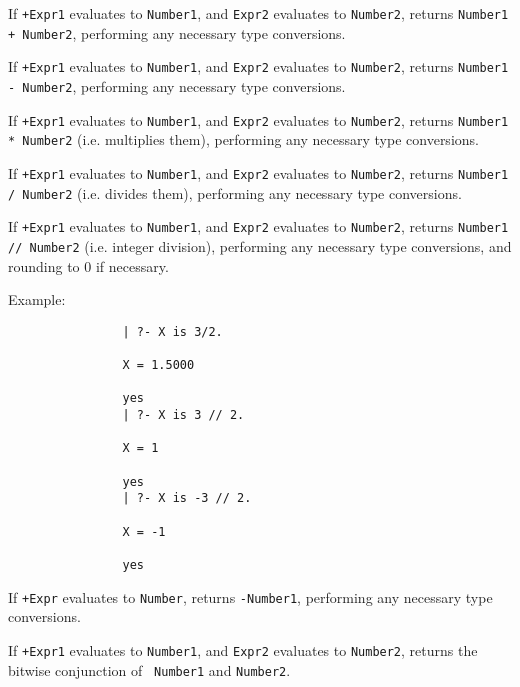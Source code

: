 \begin{description}
If {\tt +Expr1} evaluates to {\tt Number1}, and {\tt Expr2} evaluates
to {\tt Number2}, returns {\tt Number1 + Number2}, performing any
necessary type conversions.

If {\tt +Expr1} evaluates to {\tt Number1}, and {\tt Expr2} evaluates
to {\tt Number2}, returns {\tt Number1 - Number2}, performing any
necessary type conversions.

If {\tt +Expr1} evaluates to {\tt Number1}, and {\tt Expr2} evaluates
to {\tt Number2}, returns {\tt Number1 * Number2} (i.e. multiplies
them), performing any necessary type conversions.

If {\tt +Expr1} evaluates to {\tt Number1}, and {\tt Expr2} evaluates
to {\tt Number2}, returns {\tt Number1 / Number2} (i.e. divides
them), performing any necessary type conversions.

If {\tt +Expr1} evaluates to {\tt Number1}, and {\tt Expr2} evaluates
to {\tt Number2}, returns {\tt Number1 // Number2} (i.e. integer
division), performing any necessary type conversions, and rounding to
0 if necessary.  

    Example:
    {\footnotesize
     \begin{verbatim}
                | ?- X is 3/2.

                X = 1.5000

                yes
                | ?- X is 3 // 2.

                X = 1

                yes
                | ?- X is -3 // 2.

                X = -1

                yes
  \end{verbatim}}

%
 If {\tt +Expr} evaluates to {\tt Number}, returns {\tt -Number1},
 performing any necessary type conversions.

%
 If {\tt +Expr1} evaluates to {\tt Number1}, and {\tt Expr2}
evaluates to {\tt Number2}, returns the bitwise conjunction of {\tt
Number1} and {\tt Number2}.


\end{description}
